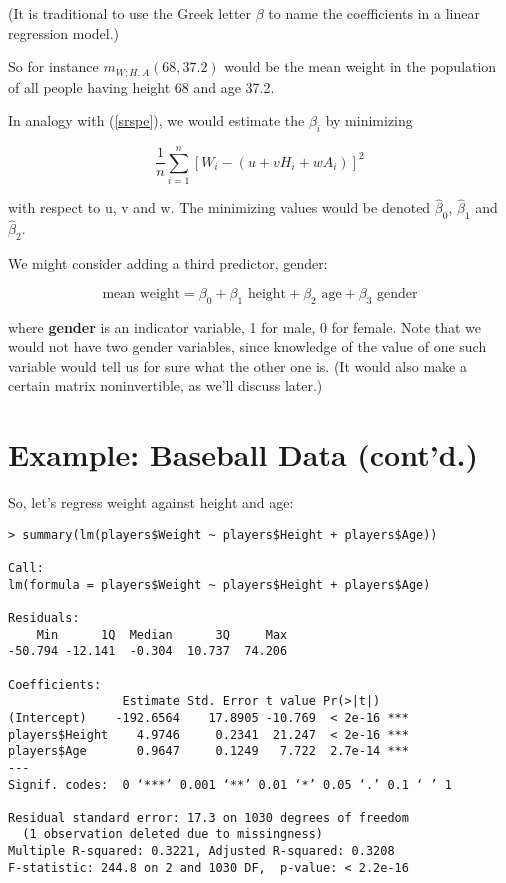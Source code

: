 (It is traditional to use the Greek letter $\beta$ to name the
coefficients in a linear regression model.)

So for instance $m_{W;H,A}(68,37.2)$ would be the mean weight in the
population of all people having height 68 and age 37.2.

In analogy with (\ref{srspe}), we would estimate the $\beta_i$ by
minimizing

\begin{equation}
\label{srspe2}
\frac{1}{n} \sum_{i=1}^n \left [ W_i - (u+vH_i+wA_i) \right ]^2
\end{equation}

with respect to u, v and w.  The minimizing values would be denoted
$\widehat{\beta}_0$, $\widehat{\beta}_1$ and $\widehat{\beta}_2$.

We might consider adding a third predictor, gender:

\begin{equation}
\label{wthtagegender}
\textrm{mean weight} = \beta_0 + \beta_1 \textrm{ height} + 
\beta_2 \textrm{ age} + \beta_3 \textrm{ gender}
\end{equation}

where {\bf gender} is an indicator variable, 1 for male, 0 for female.
Note that we would not have two gender variables, since knowledge of the
value of one such variable would tell us for sure what the other one is.
(It would also make a certain matrix noninvertible, as we'll discuss
later.)

\section{Example:  Baseball Data (cont'd.)}
\label{baseball2}

So, let's regress weight against height and age:

\begin{lstlisting}
> summary(lm(players$Weight ~ players$Height + players$Age))

Call:
lm(formula = players$Weight ~ players$Height + players$Age)

Residuals:
    Min      1Q  Median      3Q     Max 
-50.794 -12.141  -0.304  10.737  74.206 

Coefficients:
                Estimate Std. Error t value Pr(>|t|)    
(Intercept)    -192.6564    17.8905 -10.769  < 2e-16 ***
players$Height    4.9746     0.2341  21.247  < 2e-16 ***
players$Age       0.9647     0.1249   7.722  2.7e-14 ***
---
Signif. codes:  0 ‘***’ 0.001 ‘**’ 0.01 ‘*’ 0.05 ‘.’ 0.1 ‘ ’ 1 

Residual standard error: 17.3 on 1030 degrees of freedom
  (1 observation deleted due to missingness)
Multiple R-squared: 0.3221,	Adjusted R-squared: 0.3208 
F-statistic: 244.8 on 2 and 1030 DF,  p-value: < 2.2e-16 
\end{lstlisting}

